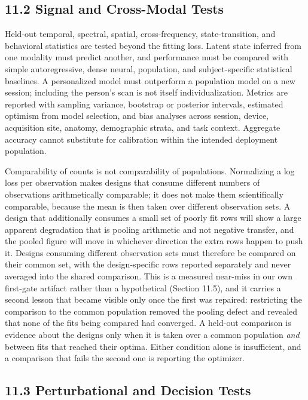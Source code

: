 \subsection{11.2 Signal and Cross-Modal Tests}

Held-out temporal, spectral, spatial, cross-frequency, state-transition, and
behavioral statistics are tested beyond the fitting loss. Latent state inferred
from one modality must predict another, and performance must be compared with
simple autoregressive, dense neural, population, and subject-specific
statistical baselines. A personalized model must outperform a population model
on a new session; including the person's scan is not itself individualization.
Metrics are reported with sampling variance, bootstrap or posterior intervals,
estimated optimism from model selection, and bias analyses across session,
device, acquisition site, anatomy, demographic strata, and task context.
Aggregate accuracy cannot substitute for calibration within the intended
deployment population.

Comparability of counts is not comparability of populations. Normalizing a log
loss per observation makes designs that consume different numbers of
observations arithmetically comparable; it does not make them scientifically
comparable, because the mean is then taken over different observation sets. A
design that additionally consumes a small set of poorly fit rows will show a
large apparent degradation that is pooling arithmetic and not negative
transfer, and the pooled figure will move in whichever direction the extra rows
happen to push it. Designs consuming different observation sets must therefore
be compared on their common set, with the design-specific rows reported
separately and never averaged into the shared comparison. This is a measured
near-miss in our own first-gate artifact rather than a hypothetical
(Section 11.5), and it carries a second lesson that became visible only once the
first was repaired: restricting the comparison to the common population removed
the pooling defect and revealed that none of the fits being compared had
converged. A held-out comparison is evidence about the designs only when it is
taken over a common population \emph{and} between fits that reached their
optima. Either condition alone is insufficient, and a comparison that fails the
second one is reporting the optimizer.

\subsection{11.3 Perturbational and Decision Tests}

